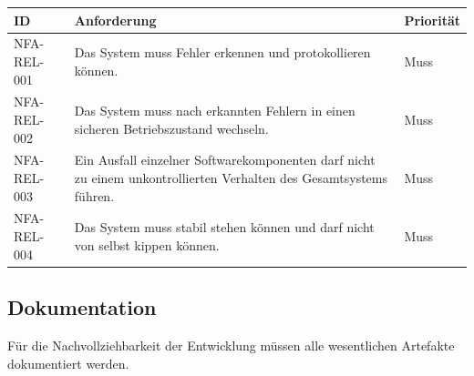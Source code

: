 \begin{longtable}[]{@{}
  >{\raggedright\arraybackslash}p{}
  >{\raggedright\arraybackslash}p{}
  >{\raggedright\arraybackslash}p{}@{}}
\toprule\noalign{}
\begin{minipage}[b]{\linewidth}\raggedright
ID
\end{minipage} & \begin{minipage}[b]{\linewidth}\raggedright
Anforderung
\end{minipage} & \begin{minipage}[b]{\linewidth}\raggedright
Priorität
\end{minipage} \\
\midrule\noalign{}
\endhead
\bottomrule\noalign{}
\endlastfoot
NFA-REL-001 & Das System muss Fehler erkennen und protokollieren können.
& Muss \\
NFA-REL-002 & Das System muss nach erkannten Fehlern in einen sicheren
Betriebszustand wechseln. & Muss \\
NFA-REL-003 & Ein Ausfall einzelner Softwarekomponenten darf nicht zu
einem unkontrollierten Verhalten des Gesamtsystems führen. & Muss \\
NFA-REL-004 & Das System muss stabil stehen können und darf nicht von
selbst kippen können. & Muss \\
\end{longtable}

\subsection{Dokumentation}\label{dokumentation}

Für die Nachvollziehbarkeit der Entwicklung müssen alle wesentlichen
Artefakte dokumentiert werden.

